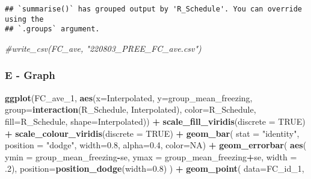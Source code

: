 \documentclass[
]{article}
\newenvironment{Shaded}{\begin{snugshade}}{\end{snugshade}}
\newcommand{\AttributeTok}[1]{\textcolor[rgb]{0.13,0.29,0.53}{#1}}
\newcommand{\CommentTok}[1]{\textcolor[rgb]{0.56,0.35,0.01}{\textit{#1}}}
\newcommand{\ConstantTok}[1]{\textcolor[rgb]{0.56,0.35,0.01}{#1}}
\newcommand{\DecValTok}[1]{\textcolor[rgb]{0.00,0.00,0.81}{#1}}
\newcommand{\FloatTok}[1]{\textcolor[rgb]{0.00,0.00,0.81}{#1}}
\newcommand{\FunctionTok}[1]{\textcolor[rgb]{0.13,0.29,0.53}{\textbf{#1}}}
\newcommand{\NormalTok}[1]{#1}
\newcommand{\SpecialCharTok}[1]{\textcolor[rgb]{0.81,0.36,0.00}{\textbf{#1}}}
\newcommand{\StringTok}[1]{\textcolor[rgb]{0.31,0.60,0.02}{#1}}
\begin{document}
\begin{verbatim}
## `summarise()` has grouped output by 'R_Schedule'. You can override using the
## `.groups` argument.
\end{verbatim}

\begin{Shaded}
\begin{Highlighting}[]
\CommentTok{\#write\_csv(FC\_ave, "220803\_PREE\_FC\_ave.csv")}
\end{Highlighting}
\end{Shaded}

\hypertarget{e---graph}{%
\subsubsection{E - Graph}\label{e---graph}}

\begin{Shaded}
\begin{Highlighting}[]
\FunctionTok{ggplot}\NormalTok{(FC\_ave\_1,}
       \FunctionTok{aes}\NormalTok{(}\AttributeTok{x=}\NormalTok{Interpolated,}
           \AttributeTok{y=}\NormalTok{group\_mean\_freezing, }
           \AttributeTok{group=}\FunctionTok{interaction}\NormalTok{(R\_Schedule, Interpolated),}
           \AttributeTok{color=}\NormalTok{R\_Schedule,}
           \AttributeTok{fill=}\NormalTok{R\_Schedule,}
           \AttributeTok{shape=}\NormalTok{Interpolated)) }\SpecialCharTok{+}
  \FunctionTok{scale\_fill\_viridis}\NormalTok{(}\AttributeTok{discrete =} \ConstantTok{TRUE}\NormalTok{) }\SpecialCharTok{+}
  \FunctionTok{scale\_colour\_viridis}\NormalTok{(}\AttributeTok{discrete =} \ConstantTok{TRUE}\NormalTok{) }\SpecialCharTok{+}
  \FunctionTok{geom\_bar}\NormalTok{(}
    \AttributeTok{stat =} \StringTok{"identity"}\NormalTok{,}
    \AttributeTok{position =} \StringTok{"dodge"}\NormalTok{,}
    \AttributeTok{width=}\FloatTok{0.8}\NormalTok{,}
    \AttributeTok{alpha=}\FloatTok{0.4}\NormalTok{,}
    \AttributeTok{color=}\ConstantTok{NA}\NormalTok{) }\SpecialCharTok{+} 
  \FunctionTok{geom\_errorbar}\NormalTok{(}
    \FunctionTok{aes}\NormalTok{(}
      \AttributeTok{ymin =}\NormalTok{ group\_mean\_freezing}\SpecialCharTok{{-}}\NormalTok{se,}
      \AttributeTok{ymax =}\NormalTok{ group\_mean\_freezing}\SpecialCharTok{+}\NormalTok{se,}
      \AttributeTok{width =}\NormalTok{ .}\DecValTok{2}\NormalTok{),}
    \AttributeTok{position=}\FunctionTok{position\_dodge}\NormalTok{(}\AttributeTok{width=}\FloatTok{0.8}\NormalTok{)}
\NormalTok{  ) }\SpecialCharTok{+}
  \FunctionTok{geom\_point}\NormalTok{(}
    \AttributeTok{data=}\NormalTok{FC\_id\_1,}

\end{Highlighting}
\end{Shaded}
\end{document}
